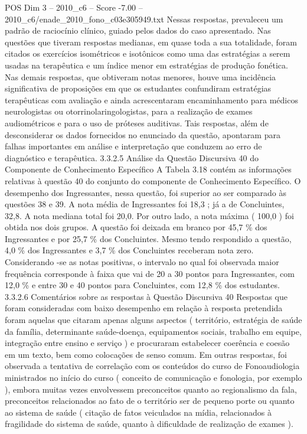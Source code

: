 \begin{textsample}{POS Dim 3 – 2010\_c6 – Score -7.00 – 2010\_c6/enade\_2010\_fono\_c03e305949.txt}
Nessas respostas, prevaleceu um padrão de raciocínio clínico, guiado pelos dados do caso apresentado.
Nas questões que tiveram respostas medianas, em quase toda a sua totalidade, foram citados os exercícios isométricos e isotônicos como uma das estratégias a serem usadas na terapêutica e um índice menor em estratégias de produção fonética.
Nas demais respostas, que obtiveram notas menores, houve uma incidência significativa de proposições em que os estudantes confundiram estratégias terapêuticas com avaliação e ainda acrescentaram encaminhamento para médicos neurologistas ou otorrinolaringologistas, para a realização de exames audiométricos e para o uso de próteses auditivas.
Tais respostas, além de desconsiderar os dados fornecidos no enunciado da questão, apontaram para falhas importantes em análise e interpretação que conduzem ao erro de diagnóstico e terapêutica. 3.3.2.5 Análise da Questão Discursiva 40 do Componente de Conhecimento Específico A Tabela 3.18 contém as informações relativas à questão 40 do conjunto do componente de Conhecimento Específico.
O desempenho dos Ingressantes, nessa questão, foi superior ao ser comparado às questões 38 e 39.
A nota média de Ingressantes foi 18,3 ; já a de Concluintes, 32,8.
A nota mediana total foi 20,0.
Por outro lado, a nota máxima ( 100,0 ) foi obtida nos dois grupos.
A questão foi deixada em branco por 45,7 \% dos Ingressantes e por 25,7 \% dos Concluintes.
Mesmo tendo respondido a questão, 4,0 \% dos Ingressantes e 3,7 \% dos Concluintes receberam nota zero.
Considerando -se as notas positivas, o intervalo no qual foi observada maior frequência corresponde à faixa que vai de 20 a 30 pontos para Ingressantes, com 12,0 \% e entre 30 e 40 pontos para Concluintes, com 12,8 \% dos estudantes. 3.3.2.6 Comentários sobre as respostas à Questão Discursiva 40 Respostas que foram consideradas com baixo desempenho em relação à resposta pretendida foram aquelas que citaram apenas alguns aspectos ( território, estratégia de saúde da família, determinante saúde-doença, equipamentos sociais, trabalho em equipe, integração entre ensino e serviço ) e procuraram estabelecer coerência e coesão em um texto, bem como colocações de senso comum.
Em outras respostas, foi observada a tentativa de correlação com os conteúdos do curso de Fonoaudiologia ministrados no início do curso ( conceito de comunicação e fonologia, por exemplo ), embora muitas vezes envolvessem preconceitos quanto ao regionalismo da fala, preconceitos relacionados ao fato de o território ser de pequeno porte ou quanto ao sistema de saúde ( citação de fatos veiculados na mídia, relacionados à fragilidade do sistema de saúde, quanto à dificuldade de realização de exames ).

\end{textsample}
